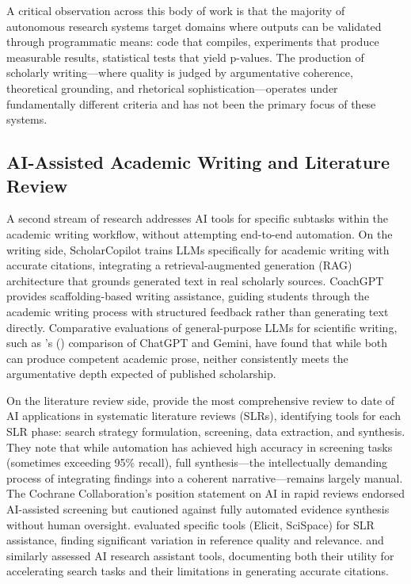 \documentclass{article}
\begin{document}
A critical observation across this body of work is that the majority of autonomous research systems target domains where outputs can be validated through programmatic means: code that compiles, experiments that produce measurable results, statistical tests that yield p-values. The production of scholarly writing---where quality is judged by argumentative coherence, theoretical grounding, and rhetorical sophistication---operates under fundamentally different criteria and has not been the primary focus of these systems.

\subsection{AI-Assisted Academic Writing and Literature Review}

A second stream of research addresses AI tools for specific subtasks within the academic writing workflow, without attempting end-to-end automation. On the writing side, ScholarCopilot \citep{wang2025scholarcopilot} trains LLMs specifically for academic writing with accurate citations, integrating a retrieval-augmented generation (RAG) architecture that grounds generated text in real scholarly sources. CoachGPT \citep{chen2025coachgpt} provides scaffolding-based writing assistance, guiding students through the academic writing process with structured feedback rather than generating text directly. Comparative evaluations of general-purpose LLMs for scientific writing, such as \citeauthor{alsagri2024chatgpt_gemini}'s (\citeyear{alsagri2024chatgpt_gemini}) comparison of ChatGPT and Gemini, have found that while both can produce competent academic prose, neither consistently meets the argumentative depth expected of published scholarship.

On the literature review side, \citet{bolanos2024ai_lit_reviews} provide the most comprehensive review to date of AI applications in systematic literature reviews (SLRs), identifying tools for each SLR phase: search strategy formulation, screening, data extraction, and synthesis. They note that while automation has achieved high accuracy in screening tasks (sometimes exceeding 95\% recall), full synthesis---the intellectually demanding process of integrating findings into a coherent narrative---remains largely manual. The Cochrane Collaboration's position statement on AI in rapid reviews \citep{gartlehner2025cochrane} endorsed AI-assisted screening but cautioned against fully automated evidence synthesis without human oversight. \citet{djukic2025slr} evaluated specific tools (Elicit, SciSpace) for SLR assistance, finding significant variation in reference quality and relevance. \citet{preisler2024correctness} and \citet{hayn2024quality} similarly assessed AI research assistant tools, documenting both their utility for accelerating search tasks and their limitations in generating accurate citations.
\end{document}
